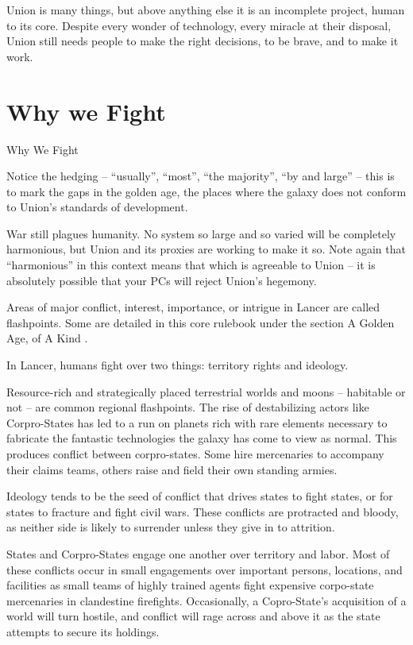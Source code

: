 Union is many things, but above anything else it is an incomplete project, human to its core.
Despite every wonder of technology, every miracle at their disposal, Union still needs people to
make the right decisions, to be brave, and to make it work.

\section{Why we Fight}
Why We Fight

Notice the hedging -- “usually”, “most”, “the majority”, “by and large” -- this is to mark the gaps
in the golden age, the places where the galaxy does not conform to Union’s standards of
development.





War still plagues humanity. No system so large and so varied will be completely harmonious, but
Union and its proxies are working to make it so. Note again that “harmonious” in this context
means that which is agreeable to Union -- it is absolutely possible that your PCs will reject
Union’s hegemony.


Areas of major conflict, interest, importance, or intrigue in Lancer are called flashpoints. Some
are detailed in this core rulebook under the section A Golden Age, of A Kind .


In Lancer, humans fight over two things: territory rights and ideology.


Resource-rich and strategically placed terrestrial worlds and moons -- habitable or not -- are
common regional flashpoints. The rise of destabilizing actors like Corpro-States has led to a run
on planets rich with rare elements necessary to fabricate the fantastic technologies the galaxy
has come to view as normal. This produces conflict between corpro-states. Some hire
mercenaries to accompany their claims teams, others raise and field their own standing armies.


Ideology tends to be the seed of conflict that drives states to fight states, or for states to fracture
and fight civil wars. These conflicts are protracted and bloody, as neither side is likely to
surrender unless they give in to attrition.


States and Corpro-States engage one another over territory and labor. Most of these conflicts
occur in small engagements over important persons, locations, and facilities as small teams of
highly trained agents fight expensive corpo-state mercenaries in clandestine firefights.
Occasionally, a Copro-State’s acquisition of a world will turn hostile, and conflict will rage across
and above it as the state attempts to secure its holdings.

